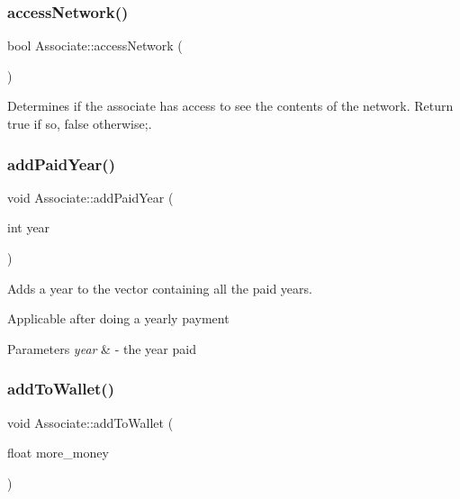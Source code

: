 \subsubsection{\texorpdfstring{access\+Network()}{accessNetwork()}}
{\footnotesize\ttfamily bool Associate\+::access\+Network (\begin{DoxyParamCaption}{ }\end{DoxyParamCaption})}



Determines if the associate has access to see the contents of the network. Return true if so, false otherwise;. 

\mbox{\label{classAssociate_a12bec7095075fd58fafb5ebf2a24e924}} 
\subsubsection{\texorpdfstring{add\+Paid\+Year()}{addPaidYear()}}
{\footnotesize\ttfamily void Associate\+::add\+Paid\+Year (\begin{DoxyParamCaption}\item[{int}]{year }\end{DoxyParamCaption})}



Adds a year to the vector containing all the paid years. 

Applicable after doing a yearly payment


\begin{DoxyParams}{Parameters}
{\em year} & -\/ the year paid \\
\hline
\end{DoxyParams}
\mbox{\label{classAssociate_a3fcb7919843353de4d4591b2bd627189}} 
\subsubsection{\texorpdfstring{add\+To\+Wallet()}{addToWallet()}}
{\footnotesize\ttfamily void Associate\+::add\+To\+Wallet (\begin{DoxyParamCaption}\item[{float}]{more\+\_\+money }\end{DoxyParamCaption})}



